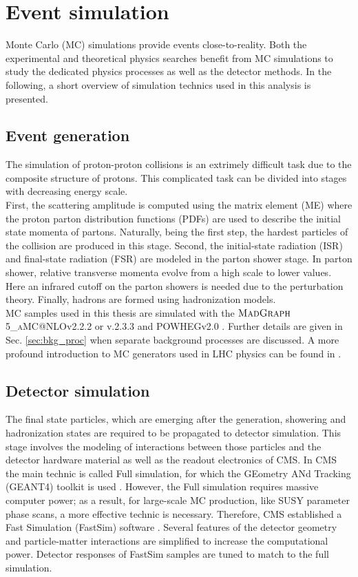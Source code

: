 \section{Event simulation}
\label{sec:simulation}
Monte Carlo (MC) simulations provide events close-to-reality. Both the experimental and theoretical physics searches benefit from MC simulations to study the dedicated physics processes as well as the detector methods.
In the following, a short overview of simulation technics used in this analysis is presented.
\subsection{Event generation}
The simulation of proton-proton collisions is an extrimely difficult task due to the composite structure of protons. This complicated task can be divided into stages with decreasing energy scale.\\
First, the scattering amplitude is computed using the matrix element (ME) where the proton parton distribution functions (PDFs) are used to describe the initial state momenta of partons. Naturally, being the first step, the hardest particles of the collision are produced in this stage.
Second, the initial-state radiation (ISR) and final-state radiation (FSR) are modeled in the parton shower stage. In parton shower, relative transverse momenta evolve from a high scale to lower values. Here an infrared cutoff on the parton showers is needed due to the perturbation theory. Finally, hadrons are formed using hadronization models.\\
MC samples used in this thesis are simulated with the $\textsc{MadGraph}$5\_\textsc{aMC@}NLOv2.2.2 or v.2.3.3 \cite{MADGRAPH} and POWHEGv2.0 \cite{POWHEG1,POWHEG2,POWHEG3,POWHEG4,POWHEG5}. Further details are given in Sec. \ref{sec:bkg_proc} when separate background processes are discussed.
A more profound introduction to MC generators used in LHC physics can be found in \cite{EventGen1}.
\subsection{Detector simulation}
The final state particles, which are emerging after the generation, showering and hadronization states are required to be propagated to detector simulation.  This stage involves the modeling of interactions between those particles and the detector hardware material as well as the readout electronics of CMS. 
In CMS the main technic is called Full simulation, for which the GEometry ANd Tracking (GEANT4) toolkit is used \cite{GEANT}.
However, the Full simulation requires massive computer power; as a result, for large-scale MC production, like SUSY parameter phase scans, a more effective technic is necessary. 
Therefore, CMS established a Fast Simulation (FastSim) software \cite{fastsim}. Several features of the detector geometry and particle-matter interactions are simplified to increase the computational power. Detector responses of FastSim samples are tuned to match to the full simulation. 
